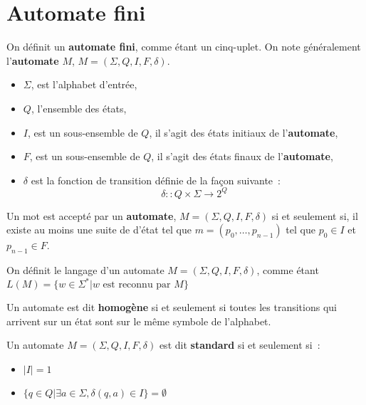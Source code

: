 \section{Automate fini}

\begin{Definition}
  On définit un \textbf{automate fini}, comme étant un cinq-uplet. On note 
  généralement l'\textbf{automate} \(M\), \(M = (\Sigma, Q, I, F, \delta)\).
  \begin{itemize}
    \item \(\Sigma\), est l'alphabet d'entrée,
    \item \(Q\), l'ensemble des états,
    \item \(I\), est un sous-ensemble de \(Q\), il s'agit des états initiaux de 
    l'\textbf{automate},
    \item \(F\), est un sous-ensemble de \(Q\), il s'agit des états finaux de 
    l'\textbf{automate},
    \item \(\delta\) est la fonction de transition définie de la façon 
    suivante~:
    \[
      \delta :: Q \times \Sigma \to 2^Q
    \]
  \end{itemize}
\end{Definition}

\begin{Definition}
  Un mot est accepté par un \textbf{automate}, \(M = (\Sigma, Q, I, F, \delta)\) 
  si et seulement si, il existe au moins une suite de d'état tel que 
  \(m = (p_0, \dots, p_{n-1})\) tel que \(p_0 \in I\) et \(p_{n-1} \in F\).
\end{Definition}

\begin{Definition}
  On définit le langage d'un automate \(M = (\Sigma, Q, I, F, \delta)\), comme 
  étant \(L(M) = \{w \in \Sigma^* | w \text{ est reconnu par } M\}\)
\end{Definition}

\begin{Definition}
  Un automate est dit \textbf{homogène} si et seulement si toutes les 
  transitions qui arrivent sur un état sont sur le même symbole de l'alphabet.
\end{Definition}

\begin{Definition}
  Un automate \(M = (\Sigma, Q, I, F, \delta)\) est dit \textbf{standard} si et 
  seulement si~:
  \begin{itemize}
    \item \(|I| = 1\)
    \item \(\{q \in Q | \exists a \in \Sigma, \delta(q, a) \in I\} = \emptyset\)
  \end{itemize}
\end{Definition}

